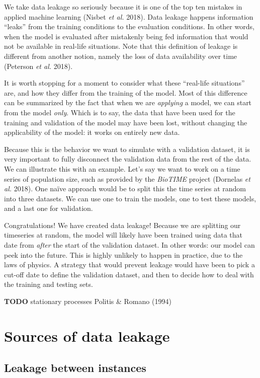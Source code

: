 \documentclass[
  letterpaper,
]{scrbook}
\begin{document}
We take data leakage so seriously because it is one of the top ten
mistakes in applied machine learning (Nisbet \emph{et al.} 2018). Data
leakage happens information ``leaks'' from the training conditions to
the evaluation conditions. In other words, when the model is evaluated
after mistakenly being fed information that would not be available in
real-life situations. Note that this definition of leakage is different
from another notion, namely the loss of data availability over time
(Peterson \emph{et al.} 2018).

It is worth stopping for a moment to consider what these ``real-life
situations'' are, and how they differ from the training of the model.
Most of this difference can be summarized by the fact that when we are
\emph{applying} a model, we can start from the model \emph{only}. Which
is to say, the data that have been used for the training and validation
of the model may have been lost, without changing the applicability of
the model: it works on entirely new data.

Because this is the behavior we want to simulate with a validation
dataset, it is very important to fully disconnect the validation data
from the rest of the data. We can illustrate this with an example. Let's
say we want to work on a time series of population size, such as
provided by the \emph{BioTIME} project (Dornelas \emph{et al.} 2018).
One naïve approach would be to split this the time series at random into
three datasets. We can use one to train the models, one to test these
models, and a last one for validation.

Congratulations! We have created data leakage! Because we are splitting
our timeseries at random, the model will likely have been trained using
data that date from \emph{after} the start of the validation dataset. In
other words: our model can peek into the future. This is highly unlikely
to happen in practice, due to the laws of physics. A strategy that would
prevent leakage would have been to pick a cut-off date to define the
validation dataset, and then to decide how to deal with the training and
testing sets.

\textbf{TODO} stationary processes Politis \& Romano (1994)

\section{Sources of data leakage}\label{leakage-sec-leakage-sources}

\subsection{Leakage between instances}\label{leakage-between-instances}
\end{document}
